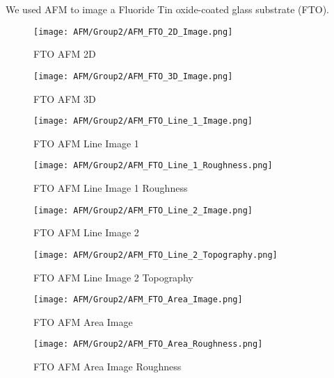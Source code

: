 \documentclass[11pt]{article}
\begin{document}
	We used AFM to image a Fluoride Tin oxide-coated glass substrate (FTO).
	
	\begin{figure}[!ht]
		\centering
		\begin{minipage}{0.45\textwidth}
			\centering
			\texttt{[image: AFM/Group2/AFM\_FTO\_2D\_Image.png]}
			\caption{FTO AFM 2D}
			\label{fig:AFM_FTO_2D_Image}
		\end{minipage}
		\begin{minipage}{0.45\textwidth}
			\centering
			\texttt{[image: AFM/Group2/AFM\_FTO\_3D\_Image.png]}
			\caption{FTO AFM 3D}
			\label{fig:AFM_FTO_3D_Image}
		\end{minipage}
	\end{figure}
	
	\begin{figure}[!ht]
		\centering
		\begin{minipage}{0.45\textwidth}
			\centering
			\texttt{[image: AFM/Group2/AFM\_FTO\_Line\_1\_Image.png]}
			\caption{FTO AFM Line Image 1}
			\label{fig:AFM_FTO_Line_1_Image}
		\end{minipage}
		\begin{minipage}{0.45\textwidth}
			\centering
			\texttt{[image: AFM/Group2/AFM\_FTO\_Line\_1\_Roughness.png]}
			\caption{FTO AFM Line Image 1 Roughness}
			\label{fig:AFM_FTO_Line_1_Roughness}
		\end{minipage}
	\end{figure}
	
	\begin{figure}[!ht]
		\centering
		\begin{minipage}{0.45\textwidth}
			\centering
			\texttt{[image: AFM/Group2/AFM\_FTO\_Line\_2\_Image.png]}
			\caption{FTO AFM Line Image 2}
			\label{fig:AFM_FTO_Line_2_Image}
		\end{minipage}
		\begin{minipage}{0.45\textwidth}
			\centering
			\texttt{[image: AFM/Group2/AFM\_FTO\_Line\_2\_Topography.png]}
			\caption{FTO AFM Line Image 2 Topography}
			\label{fig:AFM_FTO_Line_2_Topography}
		\end{minipage}
	\end{figure}
	
\clearpage
	
	\begin{figure}[!ht]
		\centering
		\begin{minipage}{0.45\textwidth}
			\centering
			\texttt{[image: AFM/Group2/AFM\_FTO\_Area\_Image.png]}
			\caption{FTO AFM Area Image}
			\label{fig:AFM_FTO_Area_Image}
		\end{minipage}
		\begin{minipage}{0.45\textwidth}
			\centering
			\texttt{[image: AFM/Group2/AFM\_FTO\_Area\_Roughness.png]}
			\caption{FTO AFM Area Image Roughness}
			\label{fig:AFM_FTO_Area_Roughness}
		\end{minipage}
	\end{figure}
	
\end{document}
